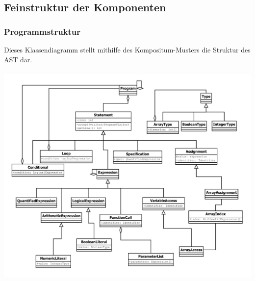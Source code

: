 \documentclass[10pt,a4paper,titlepage]{article}
\begin{document}
\subsection{Feinstruktur der Komponenten}
\subsubsection{Programmstruktur} 
Dieses Klassendiagramm stellt mithilfe des Kompositum-Musters die Struktur des AST dar. \\\\
\includegraphics[scale=0.85]{images/AST.pdf}
\end{document}
